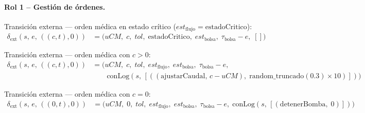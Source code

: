\paragraph{Rol 1 – Gestión de órdenes.}

Transición externa — orden médica en estado crítico ($est_{\mathrm{flujo}} = \mathrm{estadoCritico}$):
\begin{align*}
  \delta_{\mathrm{ext}}(s,\,e,\,((c,t),0))
  &= \bigl(uCM,\;c,\;tol,\;\mathrm{estadoCritico},\;est_{\mathrm{bolsa}},\;
           \tau_{\mathrm{bolsa}}-e,\; []\bigr)
\end{align*}

Transición externa — orden médica con $c > 0$:
\begin{align*}
  \delta_{\mathrm{ext}}(s,\,e,\,((c,t),0))
  &= \bigl(uCM,\;c,\;tol,\;est_{\mathrm{flujo}},\;est_{\mathrm{bolsa}},\;
           \tau_{\mathrm{bolsa}}-e, \\
  &\qquad \mathrm{conLog}(s,\,[((\mathrm{ajustarCaudal},\, c - uCM),\;
             \mathrm{random\_truncado}(0.3) \times 10)])\bigr)
\end{align*}

Transición externa — orden médica con $c = 0$:
\begin{align*}
  \delta_{\mathrm{ext}}(s,\,e,\,((0,t),0))
  &= \bigl(uCM,\;0,\;tol,\;est_{\mathrm{flujo}},\;est_{\mathrm{bolsa}},\;
           \tau_{\mathrm{bolsa}}-e,\;
           \mathrm{conLog}(s,\,[(\mathrm{detenerBomba},\;0)])\bigr)
\end{align*}

